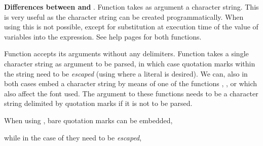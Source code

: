 \documentclass[krantz2]{krantz}\usepackage{knitr}%
\begin{document}
\begin{explainbox}
\textbf{Differences between  and }. Function  takes as argument a character string. This is very useful as the character string can be created programmatically. When using  this is not possible, except for substitution at execution time of the value of variables into the expression. See help pages for both functions.

Function  accepts its arguments without any delimiters. Function  takes a single character string as argument to be parsed, in which case quotation marks within the string need to be \emph{escaped} (using  where a literal  is desired). We can, also in both cases embed a character string by means of one of the functions , ,  or  which also affect the font used. The argument to these functions needs to be a character string delimited by quotation marks if it is not to be parsed.

When using , bare quotation marks can be embedded,

\begin{knitrout}\footnotesize
{}\color{fgcolor}\begin{kframe}
\begin{alltt}
  \hlopt{+}
  \hlstd{()} \hlopt{+}
  \hlstd{(}\hlstd{(x[}\hlstd{]}\hlopt{*}\hlstd{))}
\end{alltt}
\end{kframe}
\end{knitrout}

while in the case of  they need to be \emph{escaped},

\begin{knitrout}\footnotesize
{}\color{fgcolor}\begin{kframe}
\begin{alltt}
  \hlopt{+}
  \hlstd{()} \hlopt{+}
  \hlstd{(}\hlstd{(} \hlstd{=} \hlstd{))}
\end{alltt}
\end{kframe}
\end{knitrout}


\end{explainbox}
\end{document}
